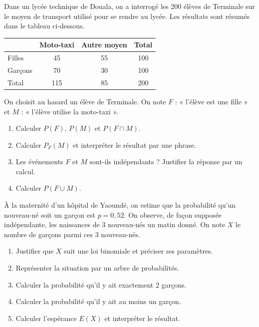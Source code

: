 \documentclass[11pt]{article}
\begin{document}
\begin{exercice}
Dans un lycée technique de Douala, on a interrogé les 200 élèves de Terminale sur le moyen de transport utilisé pour se rendre au lycée. Les résultats sont résumés dans le tableau ci-dessous.

\begin{center}
\begin{tabular}{|l|c|c|c|}
\hline
 & Moto-taxi & Autre moyen & Total \\
\hline
Filles & 45 & 55 & 100 \\
\hline
Garçons & 70 & 30 & 100 \\
\hline
Total & 115 & 85 & 200 \\
\hline
\end{tabular}
\end{center}

On choisit au hasard un élève de Terminale. On note $F$ : « l'élève est une fille » et $M$ : « l'élève utilise la moto-taxi ».
\begin{enumerate}
\item Calculer $P(F)$, $P(M)$ et $P(F \cap M)$.
\item Calculer $P_F(M)$ et interpréter le résultat par une phrase.
\item Les événements $F$ et $M$ sont-ils indépendants ? Justifier la réponse par un calcul.
\item Calculer $P(F \cup M)$.
\end{enumerate}
\end{exercice}

\begin{exercice}
À la maternité d'un hôpital de Yaoundé, on estime que la probabilité qu'un nouveau-né soit un garçon est $p = 0{,}52$. On observe, de façon supposée indépendante, les naissances de 3 nouveau-nés un matin donné. On note $X$ le nombre de garçons parmi ces 3 nouveau-nés.
\begin{enumerate}
\item Justifier que $X$ suit une loi binomiale et préciser ses paramètres.
\item Représenter la situation par un arbre de probabilités.
\item Calculer la probabilité qu'il y ait exactement 2 garçons.
\item Calculer la probabilité qu'il y ait au moins un garçon.
\item Calculer l'espérance $E(X)$ et interpréter le résultat.
\end{enumerate}
\end{exercice}
\end{document}
